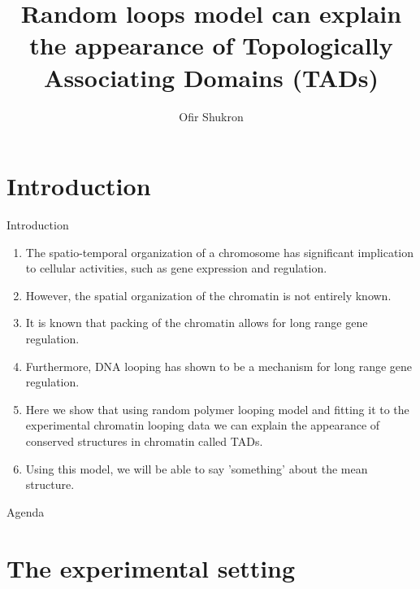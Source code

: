 \documentclass[8pt]{beamer}
\title{Random loops model can explain the appearance of Topologically Associating Domains (TADs)}
\author{Ofir Shukron}
\begin{document}
\begin{frame} %
\titlepage
\end{frame}

\section{Introduction}\label{section_introduction}
\begin{frame}{Introduction}
\begin{enumerate}
\item The spatio-temporal organization of a chromosome has significant implication to cellular activities, such as gene expression and regulation. 
\item However, the spatial organization of the chromatin is not entirely known.
\item It is known that packing of the chromatin allows for long range gene regulation.
\item Furthermore, DNA looping has shown to be a mechanism for long range gene regulation.
\item Here we show that using random polymer looping model and fitting it to the experimental chromatin looping data we can explain the appearance of conserved structures in chromatin called TADs.
\item Using this model, we will be able to say 'something' about the mean structure.
\end{enumerate}
\end{frame}

\begin{frame}{Agenda}
\tableofcontents
\end{frame}


\section{The experimental setting}\label{section_theExperimentalSetting}
\end{document}
